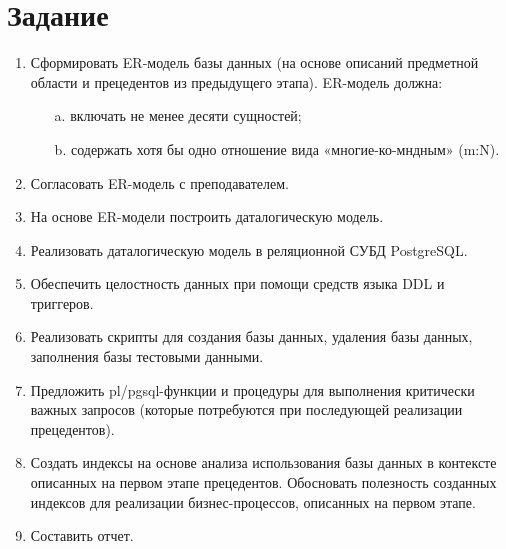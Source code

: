 \documentclass[12pt]{report}
\begin{document}
	\section*{Задание}
	\begin{enumerate}
		\item Сформировать ER-модель базы данных (на основе описаний предметной области и прецедентов из предыдущего этапа). ER-модель должна:
		\begin{itemize}
			\item[a.] включать не менее десяти сущностей;
			\item[b.] содержать хотя бы одно отношение вида «многие-ко-мндным» (m:N).
		\end{itemize}
		
		\item Согласовать ER-модель с преподавателем. \\
		
		\item На основе ER-модели построить даталогическую модель. \\
		
		\item Реализовать даталогическую модель в реляционной СУБД PostgreSQL. \\
		
		\item Обеспечить целостность данных при помощи средств языка DDL и триггеров. \\
		
		\item Реализовать скрипты для создания базы данных, удаления базы данных, заполнения базы тестовыми данными. \\
		
		\item Предложить pl/pgsql-функции и процедуры для выполнения критически важных запросов (которые потребуются при последующей реализации прецедентов). \\
		
		\item Создать индексы на основе анализа использования базы данных в контексте описанных на первом этапе прецедентов. Обосновать полезность созданных индексов для реализации бизнес-процессов, описанных на первом этапе. \\
		
		\item Составить отчет. \\
	\end{enumerate}
	\newpage
	
\end{document}
